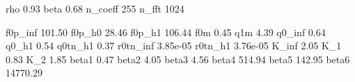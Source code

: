 rho      	     0.93
beta     	     0.68
n_coeff  	      255  
n_fft    	     1024  

f0p_inf  	   101.50
f0p_h0   	    28.46
f0p_h1   	   106.44
f0m      	     0.45
q1m      	     4.39
q0_inf   	     0.64
q0_h1    	     0.54
q0tn_h1  	     0.37
r0tn_inf 	 3.85e-05
r0tn_h1  	 3.76e-05
K_inf    	     2.05
K_1      	     0.83
K_2      	     1.85
beta1    	     0.47
beta2    	     4.05
beta3    	     4.56
beta4    	   514.94
beta5    	   142.95
beta6    	 14770.29
